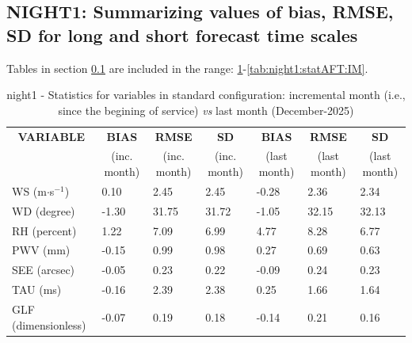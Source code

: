\subsection{NIGHT1: Summarizing values of bias, RMSE, SD for long and short forecast time scales}\label{subsec:night1:stat}
Tables in section \ref{subsec:night1:stat} are included in the range: \ref{tab:night1:statBEF}-\ref{tab:night1:statAFT:IM}.
\begin{table}[h!]
\begin{center}
\begin{tabular}{|l|l|l|l|l|l|l|}
\hline
\multicolumn{1}{|c|}{\cellcolor[HTML]{C0C0C0}\textbf{VARIABLE}} & \multicolumn{1}{c|}{\cellcolor[HTML]{C0C0C0}\textbf{BIAS}} & \multicolumn{1}{c|}{\cellcolor[HTML]{C0C0C0}\textbf{RMSE}} & \multicolumn{1}{c|}{\cellcolor[HTML]{C0C0C0}\textbf{SD}} & \multicolumn{1}{c|}{\cellcolor[HTML]{C0C0C0}\textbf{BIAS}} & \multicolumn{1}{c|}{\cellcolor[HTML]{C0C0C0}\textbf{RMSE}} & \multicolumn{1}{c|}{\cellcolor[HTML]{C0C0C0}\textbf{SD}}\\
\multicolumn{1}{|c|}{\cellcolor[HTML]{C0C0C0}} & \multicolumn{1}{c|}{\cellcolor[HTML]{C0C0C0}(inc. month)} & \multicolumn{1}{c|}{\cellcolor[HTML]{C0C0C0}(inc. month)} & \multicolumn{1}{c|}{\cellcolor[HTML]{C0C0C0}(inc. month)} & \multicolumn{1}{c|}{\cellcolor[HTML]{C0C0C0}(last month)} & \multicolumn{1}{c|}{\cellcolor[HTML]{C0C0C0}(last month)} & \multicolumn{1}{c|}{\cellcolor[HTML]{C0C0C0}(last month)}\\\hline
\cellcolor[HTML]{C0C0C0}WS (m$\cdot$s$^{-1}$) &      0.10  &      2.45  &      2.45  &     -0.28     &      2.36     &      2.34\\
\cellcolor[HTML]{C0C0C0}WD (degree)           &     -1.30  &     31.75  &     31.72  &     -1.05     &     32.15     &     32.13\\
\cellcolor[HTML]{C0C0C0}RH (percent)          &      1.22  &      7.09  &      6.99  &      4.77     &      8.28     &      6.77\\
\cellcolor[HTML]{C0C0C0}PWV (mm)              &     -0.15 &      0.99 &      0.98 &      0.27    &      0.69    &      0.63\\
\cellcolor[HTML]{C0C0C0}SEE (arcsec)          &     -0.05 &      0.23 &      0.22 &     -0.09    &      0.24    &      0.23\\
\cellcolor[HTML]{C0C0C0}TAU (ms)              &     -0.16 &      2.39 &      2.38 &      0.25    &      1.66    &      1.64\\
\cellcolor[HTML]{C0C0C0}GLF (dimensionless)   &     -0.07 &      0.19 &      0.18 &     -0.14    &      0.21    &      0.16\\
\hline
\end{tabular}
\caption{night1 - Statistics for variables in standard configuration: incremental month (i.e., since the begining of service) \textit{vs} last month (December-2025)}\label{tab:night1:statBEF}
\end{center}
\end{table}


